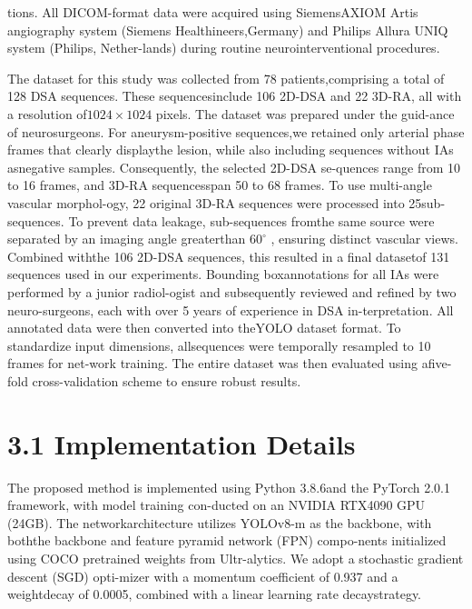 \documentclass[
  10
]{article}
\begin{document}
tions. All DICOM-format data were acquired using SiemensAXIOM Artis
angiography system (Siemens Healthineers,Germany) and Philips Allura
UNIQ system (Philips, Nether-lands) during routine neurointerventional
procedures.

The dataset for this study was collected from 78 patients,comprising a
total of 128 DSA sequences. These sequencesinclude 106 2D-DSA and 22
3D-RA, all with a resolution of\(1 0 2 4 \times 1 0 2 4\) pixels. The
dataset was prepared under the guid-ance of neurosurgeons. For
aneurysm-positive sequences,we retained only arterial phase frames that
clearly displaythe lesion, while also including sequences without IAs
asnegative samples. Consequently, the selected 2D-DSA se-quences range
from 10 to 16 frames, and 3D-RA sequencesspan 50 to 68 frames. To use
multi-angle vascular morphol-ogy, 22 original 3D-RA sequences were
processed into 25sub-sequences. To prevent data leakage, sub-sequences
fromthe same source were separated by an imaging angle greaterthan
\(6 0 ^ { \circ }\) , ensuring distinct vascular views. Combined withthe
106 2D-DSA sequences, this resulted in a final datasetof 131 sequences
used in our experiments. Bounding boxannotations for all IAs were
performed by a junior radiol-ogist and subsequently reviewed and refined
by two neuro-surgeons, each with over 5 years of experience in DSA
in-terpretation. All annotated data were then converted into theYOLO
dataset format. To standardize input dimensions, allsequences were
temporally resampled to 10 frames for net-work training. The entire
dataset was then evaluated using afive-fold cross-validation scheme to
ensure robust results.

\section{3.1 Implementation Details}\label{implementation-details}

The proposed method is implemented using Python 3.8.6and the PyTorch
2.0.1 framework, with model training con-ducted on an NVIDIA RTX4090 GPU
(24GB). The networkarchitecture utilizes YOLOv8-m as the backbone, with
boththe backbone and feature pyramid network (FPN) compo-nents
initialized using COCO pretrained weights from Ultr-alytics. We adopt a
stochastic gradient descent (SGD) opti-mizer with a momentum coefficient
of 0.937 and a weightdecay of 0.0005, combined with a linear learning
rate decaystrategy.
\end{document}
